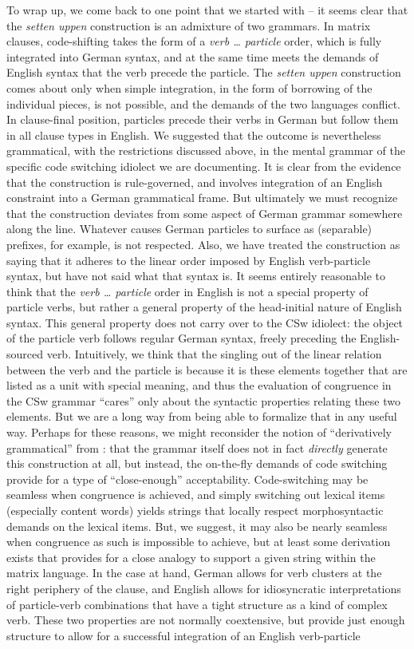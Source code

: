 \documentclass[output=paper]{langscibook}
\begin{document}
To wrap up, we come back to one point that we started with -- it seems clear that the \textit{setten uppen} construction is an admixture of two grammars. In matrix clauses, code-shifting takes the form of a \textit{verb {\ldots} particle} order, which is fully integrated into German syntax, and at the same time meets the demands of English syntax that the verb precede the particle. The \textit{setten uppen} construction comes about only when simple integration, in the form of borrowing of the individual pieces, is not possible, and the demands of the two languages conflict. In clause-final position, particles precede their verbs in German but follow them in all clause types in English. We suggested that the outcome is nevertheless grammatical, with the restrictions discussed above, in the mental grammar of the specific code switching idiolect we are documenting. It is clear from the evidence that the construction is rule-governed, and involves integration of an English constraint into a German grammatical frame. But ultimately we must recognize that the construction deviates from some aspect of German grammar somewhere along the line. Whatever causes German particles to surface as (separable) prefixes, for example, is not respected. Also, we have treated the construction as saying that it adheres to the linear order imposed by English verb-particle syntax, but have not said what that syntax is. It seems entirely reasonable to think that the \textit{verb {\ldots} particle} order in English is not a special property of particle verbs, but rather a general property of the head-initial nature of English syntax. This general property does not carry over to the CSw idiolect: the object of the particle verb follows regular German syntax, freely preceding the English-sourced verb. Intuitively, we think that the singling out of the linear relation between the verb and the particle is because it is these elements together that are listed as a unit with special meaning, and thus the evaluation of congruence in the CSw grammar ``cares'' only about the syntactic properties relating these two elements. But we are a long way from being able to formalize that in any useful way. Perhaps for these reasons, we might reconsider the notion of ``derivatively grammatical'' from \citet[242]{chomsky65}: that the grammar itself does not in fact \textit{directly} generate this construction at all, but instead, the on-the-fly demands of code switching provide for a type of ``close-enough'' acceptability. Code-switching may be seamless when congruence is achieved, and simply switching out lexical items (especially content words) yields strings that locally respect morphosyntactic demands on the lexical items. But, we suggest, it may also be nearly seamless when congruence as such is impossible to achieve, but at least some derivation exists that provides for a close analogy to support a given string within the matrix language. In the case at hand, German allows for verb clusters at the right periphery of the clause, and English allows for idiosyncratic interpretations of particle-verb combinations that have a tight structure as a kind of complex verb. These two properties are not normally coextensive, but provide just enough structure to allow for a successful integration of an English verb-particle 
\end{document}
